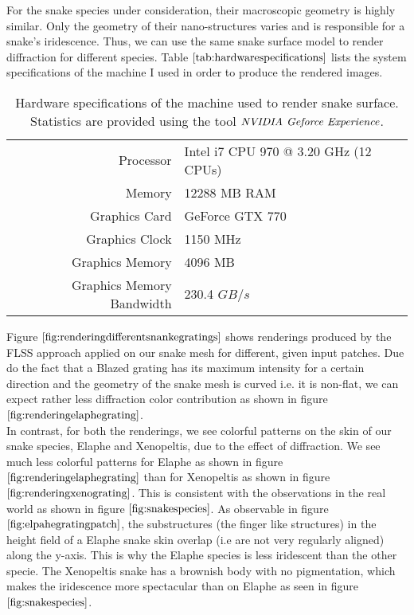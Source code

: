 For the snake species under consideration, their macroscopic geometry is highly similar. Only the geometry of their nano-structures varies and is responsible for a snake's iridescence. Thus, we can use the same snake surface model to render diffraction for different species. Table $\ref{tab:hardwarespecifications}$ lists the system specifications of the machine I used in order to produce the rendered images.

\begin{table}[H]
  \centering
  \begin{tabular}{|r|l|}
    \hline
    Processor & Intel i7 CPU 970 @ 3.20 GHz (12 CPUs) \\
    Memory & 12288 MB RAM \\
    Graphics Card & GeForce GTX 770 \\
    Graphics Clock & 1150 MHz \\
    Graphics Memory & 4096 MB \\
    Graphics Memory Bandwidth & 230.4 $GB/s$ \\
    \hline  
  \end{tabular}
\caption[Hardware Specifications]{Hardware specifications of the machine used to render snake surface. Statistics are provided using the tool $\emph{NVIDIA Geforce Experience}$.}
\label{tab:hardwarespecifications}
\end{table}

Figure $\ref{fig:renderingdifferentsnankegratings}$ shows renderings produced by the FLSS approach applied on our snake mesh for different, given input patches. Due do the fact that a Blazed grating has its maximum intensity for a certain direction and the geometry of the snake mesh is curved i.e. it is non-flat, we can expect rather less diffraction color contribution as shown in figure $\ref{fig:renderingelaphegrating}$. \\


In contrast, for both the renderings, we see colorful patterns on the skin of our snake species, Elaphe and Xenopeltis, due to the effect of diffraction. We see much less colorful patterns for Elaphe as shown in figure $\ref{fig:renderingelaphegrating}$ than for Xenopeltis as shown in figure $\ref{fig:renderingxenograting}$. This is consistent with the observations in the real world as shown in figure $\ref{fig:snakespecies}$. As observable in figure $\ref{fig:elpahegratingpatch}$, the substructures (the finger like structures) in the height field of a Elaphe snake skin overlap (i.e are not very regularly aligned) along the y-axis. This is why the Elaphe species is less iridescent than the other specie. The Xenopeltis snake has a brownish body with no pigmentation, which makes the iridescence more spectacular than on Elaphe as seen in figure $\ref{fig:snakespecies}$. 
 
